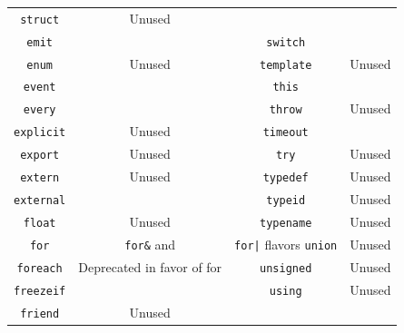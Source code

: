 \documentclass[openright,twoside,12pt]{report}
\begin{document}
\begin{table}[htp]
\begin{tabular}{|c|c||c|c|}
    \lstinline"struct"            & Unused                                  \\
    \lstinline"emit"              &                                         &
    \lstinline"switch"            &                                         \\
    \lstinline"enum"              & Unused                                  &
    \lstinline"template"          & Unused                                  \\
    \lstinline"event"             &                                         &
    \lstinline"this"              &                                         \\
    \lstinline"every"             &                                         &
    \lstinline"throw"             & Unused                                  \\
    \lstinline"explicit"          & Unused                                  &
    \lstinline"timeout"           &                                         \\
    \lstinline"export"            & Unused                                  &
    \lstinline"try"               & Unused                                  \\
    \lstinline"extern"            & Unused                                  &
    \lstinline"typedef"           & Unused                                  \\
    \lstinline"external"          &                                         &
    \lstinline"typeid"            & Unused                                  \\
    \lstinline"float"             & Unused                                  &
    \lstinline"typename"          & Unused                                  \\
    \lstinline"for"               & \lstinline|for&| and                    &
                                    \lstinline-for|- flavors
    \lstinline"union"             & Unused                                  \\
    \lstinline"foreach"           & Deprecated in favor of for              &
    \lstinline"unsigned"          & Unused                                  \\
    \lstinline"freezeif"          &                                         &
    \lstinline"using"             & Unused                                  \\
    \lstinline"friend"            & Unused                                  &

\end{tabular}
\end{table}
\end{document}
